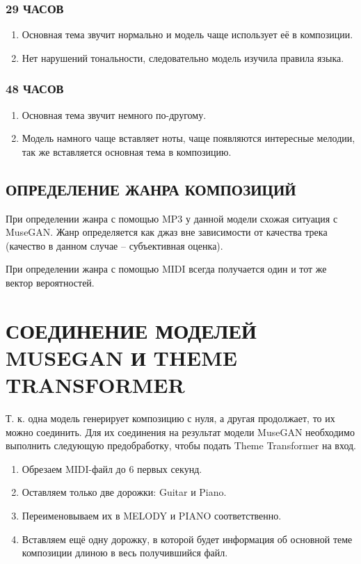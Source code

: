 \subsubsection{29 ЧАСОВ}
\begin{enumerate}
    \item Основная тема звучит нормально и модель чаще использует её в композиции.
    \item Нет нарушений тональности, следовательно модель изучила правила языка. 
\end{enumerate}

\subsubsection{48 ЧАСОВ}
\begin{enumerate}
    \item Основная тема звучит немного по-другому.
    \item Модель намного чаще вставляет ноты, чаще появляются интересные мелодии, так же вставляется основная тема в композицию.
\end{enumerate}

\subsection{ОПРЕДЕЛЕНИЕ ЖАНРА КОМПОЗИЦИЙ}
При определении жанра с помощью MP3 у данной модели схожая ситуация с MuseGAN. Жанр определяется как джаз вне зависимости от качества трека (качество в данном случае -- субъективная оценка).

При определении жанра с помощью MIDI всегда получается один и тот же вектор вероятностей.

\section{СОЕДИНЕНИЕ МОДЕЛЕЙ MUSEGAN И THEME TRANSFORMER}
Т. к. одна модель генерирует композицию с нуля, а другая продолжает, то их можно соединить. 
Для их соединения на результат модели MuseGAN необходимо выполнить следующую предобработку, чтобы подать Theme Transformer на вход.
\begin{enumerate}
    \item Обрезаем MIDI-файл до 6 первых секунд.
    \item Оставляем только две дорожки: Guitar и Piano.
    \item Переименовываем их в MELODY и PIANO соответственно.
    \item Вставляем ещё одну дорожку, в которой будет информация об основной теме композиции длиною в весь получившийся файл.
\end{enumerate}

